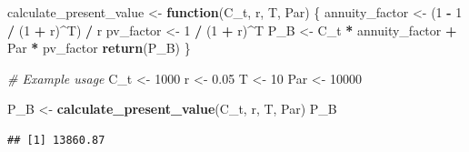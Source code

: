 \documentclass[
]{book}
\newenvironment{Shaded}{\begin{snugshade}}{\end{snugshade}}
\newcommand{\CommentTok}[1]{\textcolor[rgb]{0.56,0.35,0.01}{\textit{#1}}}
\newcommand{\ControlFlowTok}[1]{\textcolor[rgb]{0.13,0.29,0.53}{\textbf{#1}}}
\newcommand{\DecValTok}[1]{\textcolor[rgb]{0.00,0.00,0.81}{#1}}
\newcommand{\FloatTok}[1]{\textcolor[rgb]{0.00,0.00,0.81}{#1}}
\newcommand{\FunctionTok}[1]{\textcolor[rgb]{0.13,0.29,0.53}{\textbf{#1}}}
\newcommand{\NormalTok}[1]{#1}
\newcommand{\OtherTok}[1]{\textcolor[rgb]{0.56,0.35,0.01}{#1}}
\newcommand{\SpecialCharTok}[1]{\textcolor[rgb]{0.81,0.36,0.00}{\textbf{#1}}}
\begin{document}
\begin{Shaded}
\begin{Highlighting}[]
\NormalTok{calculate\_present\_value }\OtherTok{\textless{}{-}} \ControlFlowTok{function}\NormalTok{(C\_t, r, T, Par) \{}
\NormalTok{  annuity\_factor }\OtherTok{\textless{}{-}}\NormalTok{ (}\DecValTok{1} \SpecialCharTok{{-}} \DecValTok{1} \SpecialCharTok{/}\NormalTok{ (}\DecValTok{1} \SpecialCharTok{+}\NormalTok{ r)}\SpecialCharTok{\^{}}\NormalTok{T) }\SpecialCharTok{/}\NormalTok{ r}
\NormalTok{  pv\_factor }\OtherTok{\textless{}{-}} \DecValTok{1} \SpecialCharTok{/}\NormalTok{ (}\DecValTok{1} \SpecialCharTok{+}\NormalTok{ r)}\SpecialCharTok{\^{}}\NormalTok{T}
\NormalTok{  P\_B }\OtherTok{\textless{}{-}}\NormalTok{ C\_t }\SpecialCharTok{*}\NormalTok{ annuity\_factor }\SpecialCharTok{+}\NormalTok{ Par }\SpecialCharTok{*}\NormalTok{ pv\_factor}
  \FunctionTok{return}\NormalTok{(P\_B)}
\NormalTok{\}}

\CommentTok{\# Example usage}
\NormalTok{C\_t }\OtherTok{\textless{}{-}} \DecValTok{1000}
\NormalTok{r }\OtherTok{\textless{}{-}} \FloatTok{0.05}
\NormalTok{T }\OtherTok{\textless{}{-}} \DecValTok{10}
\NormalTok{Par }\OtherTok{\textless{}{-}} \DecValTok{10000}

\NormalTok{P\_B }\OtherTok{\textless{}{-}} \FunctionTok{calculate\_present\_value}\NormalTok{(C\_t, r, T, Par)}
\NormalTok{P\_B}
\end{Highlighting}
\end{Shaded}

\begin{verbatim}
## [1] 13860.87
\end{verbatim}
\end{document}

